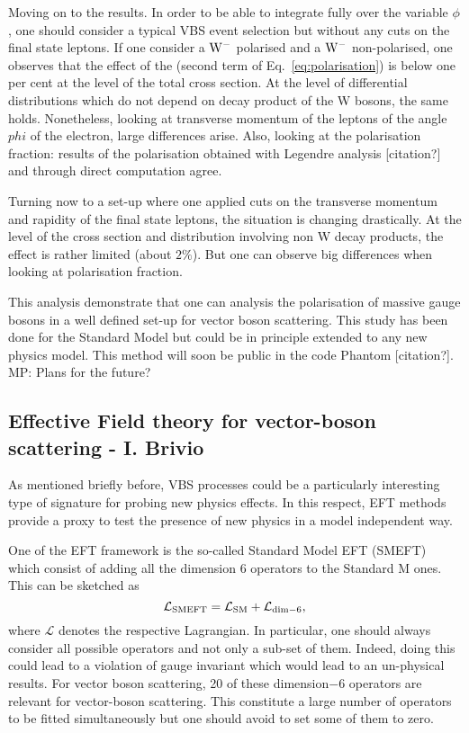 Moving on to the results.
In order to be able to integrate fully over the variable $\phi$, one should consider a typical VBS event selection but without any cuts on the final state leptons.
If one consider a ${\rm W^-}$ polarised and a ${\rm W^-}$ non-polarised, one observes that the effect of the (second term of Eq.~\eqref{eq:polarisation}) is below one per cent at the level of the total cross section.
At the level of differential distributions which do not depend on decay product of the W bosons, the same holds.
Nonetheless, looking at transverse momentum of the leptons of the angle $phi$ of the electron, large differences arise.
Also, looking at the polarisation fraction: results of the polarisation obtained with Legendre analysis [citation?] and through direct computation agree.

Turning now to a set-up where one applied cuts on the transverse momentum and rapidity of the final state leptons, the situation is changing drastically.
At the level of the cross section and distribution involving non W decay products, the effect is rather limited (about $2\%$).
But one can observe big differences when looking at polarisation fraction.

This analysis demonstrate that one can analysis the polarisation of massive gauge bosons in a well defined set-up for vector boson scattering.
This study has been done for the Standard Model but could be in principle extended to any new physics model.
This method will soon be public in the code Phantom [citation?]. \\
MP: Plans for the future?

\subsection{Effective Field theory for vector-boson scattering - I. Brivio}

As mentioned briefly before, VBS processes could be a particularly interesting type of signature for probing new physics effects.
In this respect, EFT methods provide a proxy to test the presence of new physics in a model independent way.

One of the EFT framework is the so-called Standard Model EFT (SMEFT) which consist of adding all the dimension 6 operators to the Standard M ones.
This can be sketched as
%
\begin{equation}
 \mathcal{L}_{\rm SMEFT} = \mathcal{L}_{\rm SM} + \mathcal{L}_{\rm dim-6},
\end{equation}
%
where $\mathcal{L}$ denotes the respective Lagrangian.
In particular, one should always consider all possible operators and not only a sub-set of them.
Indeed, doing this could lead to a violation of gauge invariant which would lead to an un-physical results.
For vector boson scattering, 20 of these dimension$-6$ operators are relevant for vector-boson scattering.
This constitute a large number of operators to be fitted simultaneously but one should avoid to set some of them to zero.

